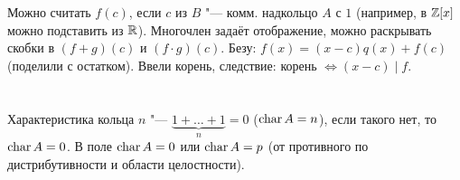 \section{} %
Можно считать $f(c)$, если $c$ из $B$ "--- комм. надкольцо $A$ с $1$ (например, в $\mathbb{Z}[x]$ можно подставить из $\mathbb{R}$). Многочлен задаёт
отображение, можно раскрывать скобки в $(f+g)(c)$ и $(f\cdot g)(c)$. Безу: $f(x)=(x-c)q(x) + f(c)$ (поделили с остатком).
Ввели корень, следствие: корень $\iff (x - c) \mid f$.

\section{} %
Характеристика кольца $n$ "--- $\underbrace{1 + \dots + 1}_n = 0$ ($\operatorname{char} A = n$), если такого нет, то $\operatorname{char} A = 0$.
В поле $\operatorname{char} A = 0$ или $\operatorname{char} A = p$ (от противного по дистрибутивности и области целостности).
